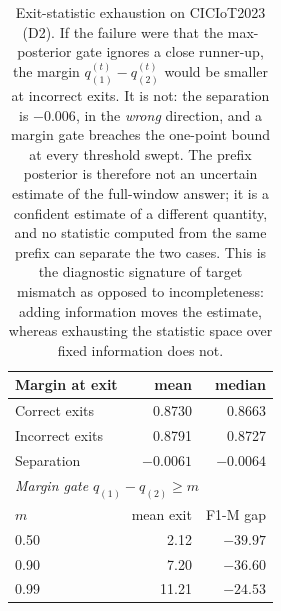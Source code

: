 \begin{table}[!t]
\centering
\caption{Exit-statistic exhaustion on CICIoT2023 (D2). If the failure were that
the max-posterior gate ignores a close runner-up, the margin
$q^{(t)}_{(1)}-q^{(t)}_{(2)}$ would be smaller at incorrect exits. It is not: the
separation is $-0.006$, in the \emph{wrong} direction, and a margin gate breaches
the one-point bound at every threshold swept. The prefix posterior is therefore
not an uncertain estimate of the full-window answer; it is a confident estimate of
a different quantity, and no statistic computed from the same prefix can separate
the two cases. This is the diagnostic signature of target mismatch as opposed to
incompleteness: adding information moves the estimate, whereas exhausting the
statistic space over fixed information does not.}
\label{tab:dep:margin}
\small
\begin{tabular}{lrr}
\toprule
Margin at exit & mean & median \\
\midrule
Correct exits   & 0.8730 & 0.8663 \\
Incorrect exits & 0.8791 & 0.8727 \\
Separation      & $-0.0061$ & $-0.0064$ \\
\midrule
\multicolumn{3}{l}{\emph{Margin gate }$q_{(1)}-q_{(2)}\ge m$} \\
$m$ & mean exit & F1-M gap \\
\midrule
0.50 &  2.12 & $-39.97$ \\
0.90 &  7.20 & $-36.60$ \\
0.99 & 11.21 & $-24.53$ \\
\bottomrule
\end{tabular}
\end{table}
